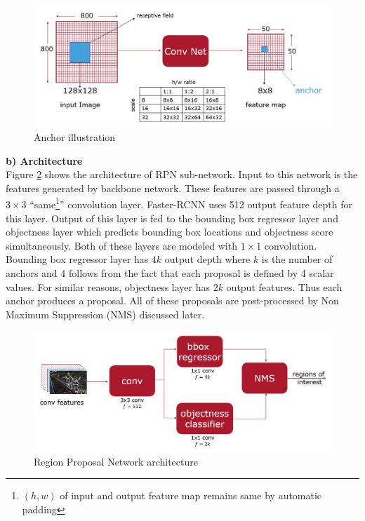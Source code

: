 \begin{figure}
    \centering
    \includegraphics[width=\linewidth]{images/anchors.PNG}
    \caption[Anchor illustration]{Anchor illustration}
    \label{fig:anchors}
\end{figure}

\textbf{b) Architecture} \\
Figure \ref{fig:RPN-architecture} shows the architecture of RPN sub-network. Input to this network is the features generated by backbone network. These features are passed through a $3\times3$ ``same\footnote{$(h,w)$ of input and output feature map remains same by automatic padding}'' convolution layer. Faster-RCNN uses 512 output feature depth for this layer. Output of this layer is fed to the bounding box regressor layer and objectness layer which predicts bounding box locations and objectness score simultaneously. Both of these layers are modeled with $1\times1$ convolution. Bounding box regressor layer has $4k$ output depth where $k$ is the number of anchors and 4 follows from the fact that each proposal is defined by 4 scalar values. For similar reasons, objectness layer has $2k$ output features. Thus each anchor produces a proposal. All of these proposals are post-processed by Non Maximum Suppression (NMS) discussed later. 

\begin{figure}
    \centering
    \includegraphics[width=\linewidth]{images/RPN-architecture.PNG}
    \caption[RPN architecture]{Region Proposal Network architecture}
    \label{fig:RPN-architecture}
\end{figure}


